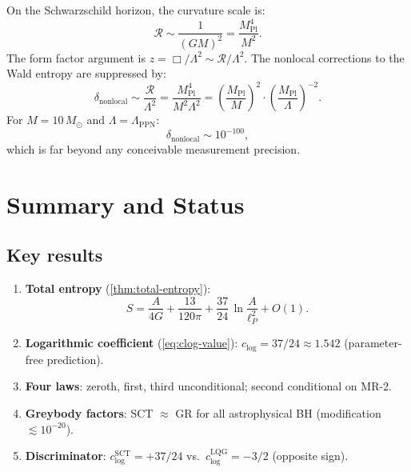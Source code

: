 \documentclass[11pt,a4paper]{article}
\newcommand{\lP}{\ell_P}
\newcommand{\MP}{M_{\mathrm{Pl}}}
\theoremstyle{plain}
\theoremstyle{definition}
\begin{document}
On the Schwarzschild horizon, the curvature scale is:
\begin{equation}
  \mathcal{R} \sim \frac{1}{(GM)^2} = \frac{\MP^4}{M^2}.
\end{equation}
The form factor argument is $z = \Box/\Lambda^2 \sim \mathcal{R}/\Lambda^2$.
The nonlocal corrections to the Wald entropy are suppressed by:
\begin{equation}
  \delta_{\mathrm{nonlocal}} \sim \frac{\mathcal{R}}{\Lambda^2}
  = \frac{\MP^4}{M^2\Lambda^2}
  = \left(\frac{\MP}{M}\right)^2 \cdot \left(\frac{\MP}{\Lambda}\right)^{-2}.
\end{equation}
For $M = 10\,M_\odot$ and $\Lambda = \Lambda_{\mathrm{PPN}}$:
\begin{equation}
  \delta_{\mathrm{nonlocal}} \sim 10^{-100},
\end{equation}
which is far beyond any conceivable measurement precision.


\section{Summary and Status}
\label{sec:summary}

\subsection{Key results}

\begin{enumerate}
  \item \textbf{Total entropy} (\cref{thm:total-entropy}):
    \begin{equation*}
      S = \frac{A}{4G} + \frac{13}{120\pi}
      + \frac{37}{24}\,\ln\frac{A}{\lP^2} + O(1).
    \end{equation*}

  \item \textbf{Logarithmic coefficient} (\cref{eq:clog-value}):
    $c_{\log} = 37/24 \approx 1.542$ (parameter-free prediction).

  \item \textbf{Four laws}: zeroth, first, third unconditional;
    second conditional on MR-2.

  \item \textbf{Greybody factors}: SCT $\approx$ GR for all
    astrophysical BH (modification $\lesssim 10^{-20}$).

  \item \textbf{Discriminator}: $c_{\log}^{\mathrm{SCT}} = +37/24$
    vs.\ $c_{\log}^{\mathrm{LQG}} = -3/2$ (opposite sign).
\end{enumerate}
\end{document}
